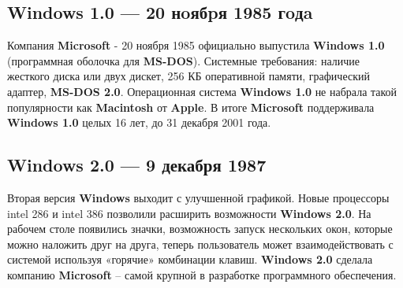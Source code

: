 \documentclass[14pt, a4paper]{article}
\begin{document}
\begin{center}
    \subsection*{Windows 1.0 — 20 нoябpя 1985 гoдa}
\end{center}


Компания \textbf{Microsoft} - 20 ноября 1985 официально выпустила \textbf{Windows 1.0}
(программная оболочка для \textbf{MS-DOS}).
Системные требования: наличие жесткого диска или двух дискет, 256 КБ оперативной памяти,
графический адаптер, \textbf{MS-DOS 2.0}.
Операционная система \textbf{Windows 1.0} не набрала такой популярности как \textbf{Macintosh} от \textbf{Apple}.
В итоге \textbf{Microsoft} поддерживала \textbf{Windows 1.0} целых 16 лет, до 31 декабря 2001 года.\newpage


\begin{centering}
    \subsection*{Windows 2.0 — 9 декабря 1987}
\end{centering}

Вторая версия \textbf{Windows} выходит с улучшенной графикой. Новые процессоры intel 286 и
intel 386 позволили расширить возможности \textbf{Windows 2.0}.
На рабочем столе появились значки, возможность запуск нескольких окон, которые можно наложить друг на друга,
теперь пользователь может взаимодействовать с системой используя «горячие» комбинации клавиш.
\textbf{Windows 2.0} сделала компанию \textbf{Microsoft} – самой крупной в разработке программного обеспечения.

\begin{figure}[h]%
    \centering
    \label{framework} %
\end{figure}\newpage
\end{document}
